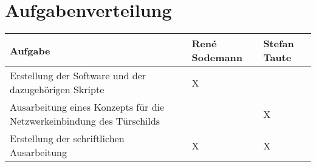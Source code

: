 
\chapter*{Aufgabenverteilung}

\begin{center}
\begin{tabular}[t]{|>{\centering\arraybackslash}p{}|>{\centering\arraybackslash}p{}|>{\centering\arraybackslash}p{}|}
\hline
Aufgabe & René Sodemann & Stefan Taute\\
\hline
Erstellung der Software und der dazugehörigen Skripte & X & \\
\hline
Ausarbeitung eines Konzepts für die Netzwerkeinbindung des Türschilds  &  & X\\
\hline
Erstellung der schriftlichen Ausarbeitung & X & X\\
\hline
\end{tabular}
\end{center}

